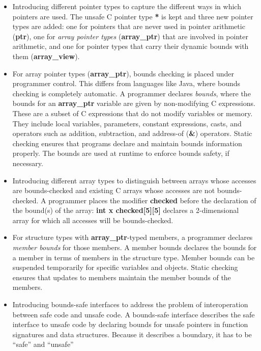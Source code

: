 \documentclass[]{article}
\begin{document}
\begin{itemize}
\item
  Introducing different pointer types to capture the different ways in
  which pointers are used. The unsafe C pointer type \textbf{*} is kept
  and three new pointer types are added: one for pointers that are never
  used in pointer arithmetic (\textbf{ptr}), one for \emph{array pointer
  types} (\textbf{array\_ptr}) that are involved in pointer arithmetic,
  and one for pointer types that carry their dynamic bounds with them
  (\textbf{array\_view}).
\item
  For array pointer types (\textbf{array\_ptr}), bounds checking is
  placed under programmer control. This differs from languages like
  Java, where bounds checking is completely automatic. A programmer
  declares \emph{bounds}, where the bounds for an \textbf{array\_ptr}
  variable are given by non-modifying C expressions. These are a subset
  of C expressions that do not modify variables or memory. They include
  local variables, parameters, constant expressions, casts, and
  operators such as addition, subtraction, and address-of (\textbf{\&})
  operators. Static checking ensures that programs declare and maintain
  bounds information properly. The bounds are used at runtime to enforce
  bounds safety, if necessary.
\item
  Introducing different array types to distinguish between arrays whose
  accesses are bounds-checked and existing C arrays whose accesses are
  not bounds-checked. A programmer places the modifier \textbf{checked}
  before the declaration of the bound(s) of the array: \textbf{int x
  checked{[}5{]}{[}5{]}} declares a 2-dimensional array for which all
  accesses will be bounds-checked.
\item
  For structure types with \textbf{array\_ptr}-typed members, a
  programmer declares \emph{member bounds} for those members. A member
  bounds declares the bounds for a member in terms of members in the
  structure type. Member bounds can be suspended temporarily for
  specific variables and objects. Static checking ensures that updates
  to members maintain the member bounds of the members.
\item
  Introducing bounds-safe interfaces to address the problem of
  interoperation between safe code and unsafe code. A bounds-safe
  interface describes the safe interface to unsafe code by declaring
  bounds for unsafe pointers in function signatures and data structures.
  Because it describes a boundary, it has to be ``safe'' and ``unsafe''

\end{itemize}
\end{document}
